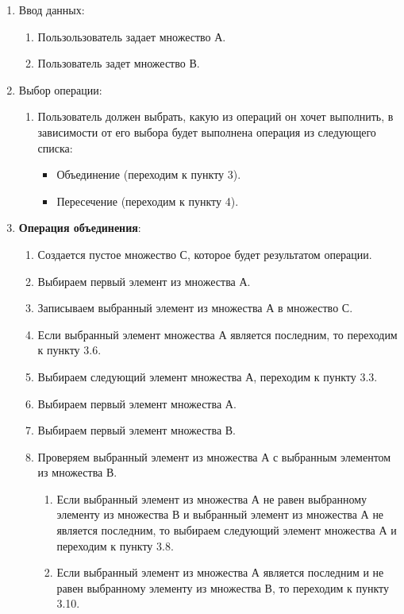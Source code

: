 \documentclass[a4paper,12pt]{extarticle}
\begin{document}
\begin{enumerate}
  \item Ввод данных:
  \begin{enumerate}[label*=\arabic*.]
    \item Пользользователь задает множество А.
    \item Пользователь задет множество В.
  \end{enumerate}
  \item Выбор операции:
  \begin{enumerate}[label*=\arabic*.]
    \item Пользователь должен выбрать, какую из операций он хочет выполнить, в зависимости от его выбора будет выполнена операция из следующего списка:
    \begin{itemize}
      \item Объединение (переходим к пункту 3).
      \item Пересечение (переходим к пункту 4).
    \end{itemize}
  \end{enumerate}
  \item \textbf{Операция объединения}:
  \begin{enumerate}[label*=\arabic*.]
    \item Создается пустое множество С, которое будет результатом операции.
    \item Выбираем первый элемент из множества А.
    \item Записываем выбранный элемент из множества А в множество С.
    \item Если выбранный элемент множества А является последним, то переходим к пункту 3.6.
    \item Выбираем следующий элемент множества А, переходим к пункту 3.3.
    \item Выбираем первый элемент множества А.
    \item Выбираем первый элемент множества В.
    \item Проверяем выбранный элемент из множества А с выбранным элементом из множества В.
    \begin{enumerate}[label*=\arabic*.]
      \item Если выбранный элемент из множества А не равен выбранному элементу из множества В и выбранный элемент из множества А не является последним, то выбираем следующий элемент множества А и переходим к пункту 3.8.
      \item Если выбранный элемент из множества А является последним и не равен выбранному элементу из множества В, то переходим к пункту 3.10.

\end{enumerate}
\end{enumerate}
\end{enumerate}
\end{document}

